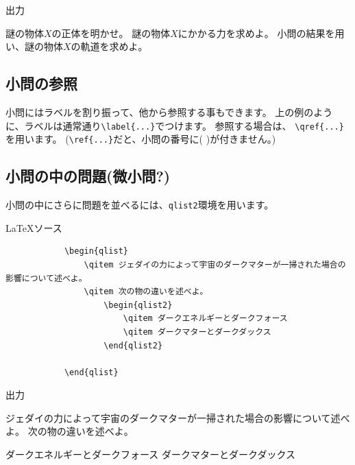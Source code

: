 \documentclass[dvipdfmx,a4j,11pt]{jarticle}
\newenvironment{inputbox}{%
	\begin{itembox}[r]{\LaTeX ソース}
}{
	\end{itembox}
}
\newenvironment{outputbox}{%
	\begin{itembox}[r]{出力}
}{%
	\end{itembox}
}
\begin{document}
	\begin{outputbox}
		\begin{qlist}
		    \qitem 謎の物体$X$の正体を明かせ。
		    \qitem \label{q:Xforce} 謎の物体$X$にかかる力を求めよ。
		    \qitem 小問の結果を用い、謎の物体$X$の軌道を求めよ。
		\end{qlist}
	\end{outputbox}
	
\subsection{小問の参照}
	小問にはラベルを割り振って、他から参照する事もできます。
	上の例のように、ラベルは通常通り{\tt \textbackslash label\{...\}}でつけます。
	参照する場合は、
	{\tt \textbackslash qref\{...\}}を用います。
	({\tt \textbackslash ref\{...\}}だと、小問の番号に( )が付きません。)
	
\subsection{小問の中の問題(微小問?)}
	小問の中にさらに問題を並べるには、{\tt qlist2}環境を用います。
	
	\begin{inputbox}
		\begin{verbatim}
			\begin{qlist}
			    \qitem ジェダイの力によって宇宙のダークマターが一掃された場合の影響について述べよ。
			    \qitem 次の物の違いを述べよ。
			        \begin{qlist2}
			            \qitem ダークエネルギーとダークフォース
			            \qitem ダークマターとダークダックス
			        \end{qlist2}
			        
			\end{qlist}
		\end{verbatim}
	\end{inputbox}
	
	\begin{outputbox}
			\begin{qlist}
			    \qitem ジェダイの力によって宇宙のダークマターが一掃された場合の影響について述べよ。
			    \qitem 次の物の違いを述べよ。
			        \begin{qlist2}
			            \qitem ダークエネルギーとダークフォース
			            \qitem ダークマターとダークダックス
			        \end{qlist2}
			        
			\end{qlist}
	\end{outputbox}
	
\end{document}
